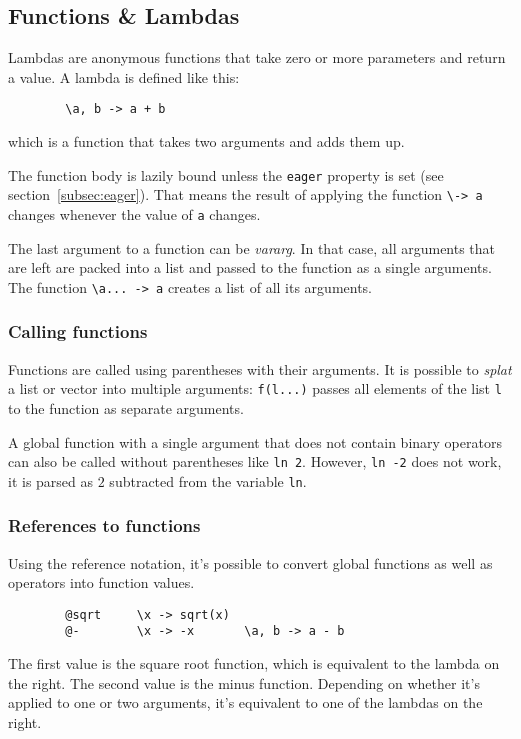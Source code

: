 \documentclass[10pt]{article}
\begin{document}
    \subsection{Functions \& Lambdas}\label{subsec:lambdas}
    Lambdas are anonymous functions that take zero or more parameters and return a value.
    A lambda is defined like this:
    \begin{verbatim}
        \a, b -> a + b
    \end{verbatim}
    which is a function that takes two arguments and adds them up.
    
    The function body is lazily bound unless the \verb|eager| property is set (see section~\ref{subsec:eager}).
    That means the result of applying the function \verb|\-> a| changes whenever the value of \verb|a| changes.
    
    The last argument to a function can be \textsl{vararg}.
    In that case, all arguments that are left are packed into a list and passed to the function as a single arguments.
    The function \verb|\a... -> a| creates a list of all its arguments.
    
    \subsubsection{Calling functions}
    Functions are called using parentheses with their arguments.
    It is possible to \textsl{splat} a list or vector into multiple arguments:
    \verb|f(l...)| passes all elements of the list \verb|l| to the function as separate arguments.
    
    A global function with a single argument that does not contain binary operators can also be called without parentheses like \verb|ln 2|.
    However, \verb|ln -2| does not work, it is parsed as $ 2 $ subtracted from the variable \verb|ln|.

    \subsubsection{References to functions}
    Using the reference notation, it's possible to convert global functions as well as operators into function values.
    \begin{verbatim}
        @sqrt     \x -> sqrt(x)
        @-        \x -> -x       \a, b -> a - b
    \end{verbatim}
    The first value is the square root function, which is equivalent to the lambda on the right.
    The second value is the minus function.
    Depending on whether it's applied to one or two arguments, it's equivalent to one of the lambdas on the right.
    
\end{document}
